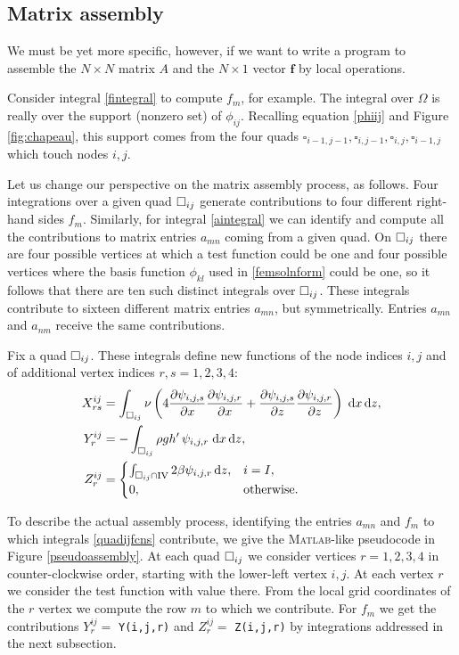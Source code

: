 \documentclass[11pt,final,reqno]{amsart}
\theoremstyle{remark}
\theoremstyle{definition}
\newcommand{\Matlab}{\textsc{Matlab}\xspace}
\begin{document}
\subsection*{Matrix assembly}  We must be yet more specific, however, if we want to write a program to assemble the $N\times N$ matrix $A$ and the $N\times 1$ vector $\mathbf{f}$ by local operations.

Consider integral \eqref{fintegral} to compute $f_m$, for example.  The integral over $\Omega$ is really over the support (nonzero set) of $\phi_{ij}$.  Recalling equation \eqref{phiij} and Figure \ref{fig:chapeau}, this support comes from the four quads $\square_{i-1,j-1}, \square_{i,j-1}, \square_{i,j}, \square_{i-1,j}$ which touch nodes $i,j$.

Let us change our perspective on the matrix assembly process, as follows.  Four integrations over a given quad $\square_{ij}$ generate contributions to four different right-hand sides $f_m$.  Similarly, for integral \eqref{aintegral} we can identify and compute all the contributions to matrix entries $a_{mn}$ coming from a given quad.  On $\square_{ij}$ there are four possible vertices at which a test function could be one and four possible vertices where the basis function $\phi_{kl}$ used in \eqref{femsolnform} could be one, so it follows that there are ten such distinct integrals over $\square_{ij}$.  These integrals contribute to sixteen different matrix entries $a_{mn}$, but symmetrically.  Entries $a_{mn}$ and $a_{nm}$ receive the same contributions.

Fix a quad $\square_{ij}$.  These integrals define new functions of the node indices $i,j$ and of additional vertex indices $r,s=1,2,3,4$:
\begin{align}
  X^{ij}_{rs} &= \int_{\square_{ij}} \nu \left(4\frac{\partial\psi_{i,j,s}}{\partial x} \frac{\partial\psi_{i,j,r}}{\partial x} + \frac{\partial\psi_{i,j,s}}{\partial z} \frac{\partial\psi_{i,j,r}}{\partial z}\right)\;\mathrm{d}x\,\mathrm{d}z,  \label{quadijfcns}  \\
  Y^{ij}_r    &= - \int_{\square_{ij}} \rho g h'\,\psi_{i,j,r} \;\mathrm{d}x\,\mathrm{d}z, \notag \\ 
  Z^{ij}_r    &= \begin{cases}
                    \int_{\square_{ij} \cap \mathrm{IV}} 2 \beta \psi_{i,j,r} \,\mathrm{d}z, & i=I, \\
                    0, & \text{otherwise}.
                 \end{cases} \notag
\end{align}

To describe the actual assembly process, identifying the entries $a_{mn}$ and $f_m$ to which integrals \eqref{quadijfcns} contribute, we give the \Matlab-like pseudocode in Figure \ref{pseudoassembly}.  At each quad $\square_{ij}$ we consider vertices $r=1,2,3,4$ in counter-clockwise order, starting with the lower-left vertex $i,j$.  At each vertex $r$ we consider the test function with value there.  From the local grid coordinates of the $r$ vertex we compute the row $m$ to which we contribute.  For $f_m$ we get the contributions $Y^{ij}_r=$ \texttt{Y(i,j,r)} and $Z^{ij}_r=$ \texttt{Z(i,j,r)} by integrations addressed in the next subsection.
\end{document}
